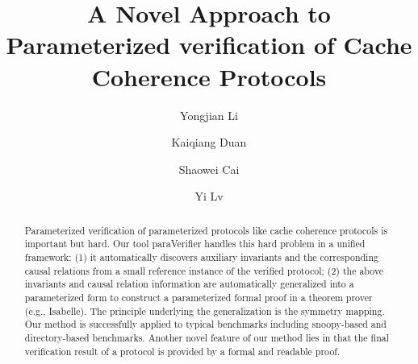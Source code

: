 \documentclass[conference]{IEEEtran}
\begin{document}
\title{ {\sf A Novel Approach to Parameterized verification of Cache Coherence Protocols}
}
\author{Yongjian Li  \and
        Kaiqiang Duan  \and
        Shaowei Cai  \and
        Yi Lv}
\maketitle
\begin{abstract}
Parameterized verification of parameterized protocols like cache coherence protocols is important
but hard.   Our tool {\sf paraVerifier} handles this hard problem in
a unified framework: (1) it automatically  discovers auxiliary invariants and the
corresponding causal relations %
 from a small reference instance of the verified protocol; (2) the above
invariants and causal relation information  are automatically generalized into a parameterized
form to construct a parameterized formal proof in a theorem prover
(e.g., Isabelle). The principle underlying the generalization is the
symmetry mapping. Our method is successfully applied to typical
benchmarks including  snoopy-based and directory-based benchmarks. Another novel
feature of our method lies in that the final verification result of a
protocol is provided by a formal and readable proof.%

\end{abstract}
\end{document}
